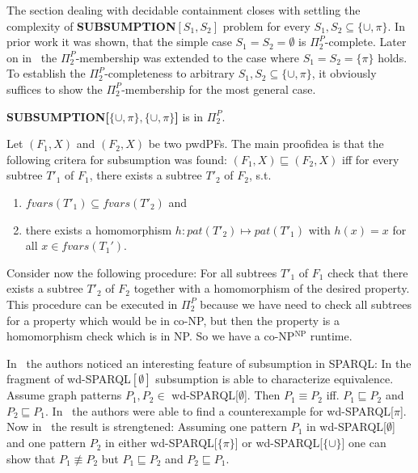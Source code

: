 The section dealing with decidable containment closes with settling the
complexity of \textbf{SUBSUMPTION$[S_1,S_2]$} problem for every $S_1, S_2 \subseteq \{
\cup, \pi \}$. In prior work \cite{letelier2012static} it was shown, that the simple case
$S_1=S_2=\emptyset$ is $\Pi_2^P$-complete. 
Later on in~\cite{letelier2013static} the $\Pi^P_2$-membership 
was extended to the case where $S_1 = S_2 = \{\pi\}$ holds.
To establish the $\Pi^P_2$-completeness to arbitrary $S_1,S_2 \subseteq \{ \cup,
\pi \}$, it obviously suffices to show the $\Pi_2^P$-membership for the most general case.

\begin{theorem}\label{scuppicuppi}
	\textbf{SUBSUMPTION[$\{\cup,\pi\}, \{ \cup, \pi \}$]} is in $\Pi^P_2$.
\end{theorem}
\begin{proofidea}
	Let $(F_1,X)$ and $(F_2,X)$ be two pwdPFs.
	The main proofidea is that the following critera for subsumption was found:
	$(F_1,X) \sqsubseteq (F_2,X)$ iff for every subtree $T'_1$ of $F_1$, there
	exists a subtree $T'_2$ of $F_2$, s.t.
	\begin{enumerate}
		\item $fvars(T'_1) \subseteq fvars(T'_2)$ and
		\item there exists a homomorphism $h:pat(T'_2) \mapsto pat(T'_1)$
			with $h(x)= x$ for all $x \in fvars(T_1')$.
	\end{enumerate}
	Consider now the following procedure:
	For all subtrees $T'_1$ of $F_1$ check that there exists a subtree $T'_2$ of
	$F_2$ together with a homomorphism of the desired property. This procedure
	can be executed in $\Pi_2^P$ because we have need to check all subtrees
	for a property which would be in co-NP, but then the property is a
	homomorphism check which is in NP. So we have a co-NP$^{\mbox{NP}}$ runtime.
\end{proofidea}

In~\cite{letelier2012static} the authors noticed an interesting feature of
subsumption in SPARQL: In the fragment of wd-SPARQL$[\emptyset]$ subsumption is
able to characterize equivalence. Assume graph patterns $P_1,P_2 \in$
wd-SPARQL[$\emptyset$]. Then $P_1 \equiv P_2$ iff. $P_1 \sqsubseteq P_2$ and 
$P_2 \sqsubseteq P_1$. In~\cite{letelier2013static} the authors were able to
find a counterexample for wd-SPARQL[$\pi$]. 
Now in~\cite{pichler2014containment} the result is strengtened:
Assuming one pattern $P_1$ in wd-SPARQL[$\emptyset$] and one pattern $P_2$ in either
wd-SPARQL[$\{\pi\}$] or wd-SPARQL[$\{\cup\}$] one can show that $P_1 \not\equiv
P_2$ but $P_1 \sqsubseteq P_2$ and $P_2 \sqsubseteq P_1$.

